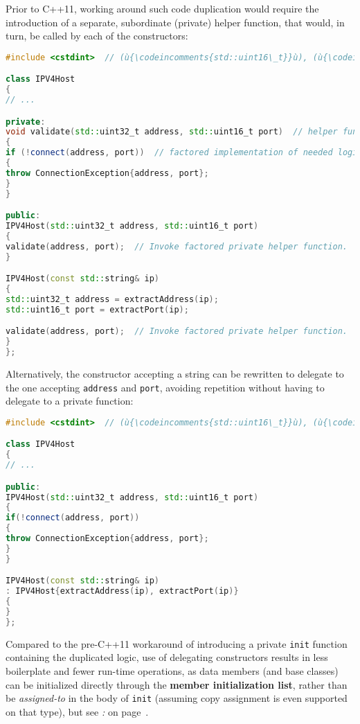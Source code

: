 \noindent Prior to C++11, working around such code duplication would require the
introduction of a separate, subordinate (private) helper function, that
would, in turn, be called by each of the constructors:

\begin{lstlisting}[language=C++]
#include <cstdint>  // (ù{\codeincomments{std::uint16\_t}}ù), (ù{\codeincomments{std::uint32\_t}}ù)

class IPV4Host
{
// ...

private:
void validate(std::uint32_t address, std::uint16_t port)  // helper function
{
if (!connect(address, port))  // factored implementation of needed logic
{
throw ConnectionException{address, port};
}
}

public:
IPV4Host(std::uint32_t address, std::uint16_t port)
{
validate(address, port);  // Invoke factored private helper function.
}

IPV4Host(const std::string& ip)
{
std::uint32_t address = extractAddress(ip);
std::uint16_t port = extractPort(ip);

validate(address, port);  // Invoke factored private helper function.
}
};
\end{lstlisting}

\noindent Alternatively, the constructor accepting a string can be rewritten to
delegate to the one accepting \texttt{address} and \texttt{port},
avoiding repetition without having to delegate to a private function:

\begin{lstlisting}[language=C++]
#include <cstdint>  // (ù{\codeincomments{std::uint16\_t}}ù), (ù{\codeincomments{std::uint32\_t}}ù)

class IPV4Host
{
// ...

public:
IPV4Host(std::uint32_t address, std::uint16_t port)
{
if(!connect(address, port))
{
throw ConnectionException{address, port};
}
}

IPV4Host(const std::string& ip)
: IPV4Host{extractAddress(ip), extractPort(ip)}
{
}
};
\end{lstlisting}

\noindent Compared to the pre-C++11 workaround of introducing a private
\texttt{init} function containing the duplicated logic, use of
delegating constructors results in less boilerplate and fewer run-time
operations, as data members (and base classes) can be initialized
directly through the \textbf{member initialization list}, rather than be
\emph{assigned-to} in the body of \texttt{init} (assuming copy
assignment is even supported on that type), but see
{\it{}:} {\it{}} on page~\pageref{suboptimal-factoring}.

